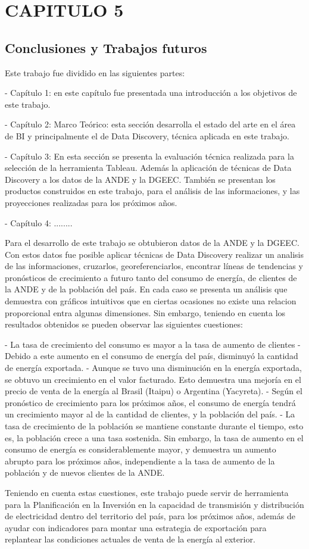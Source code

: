 \pagebreak
\chapter{CAPITULO 5}
\section{Conclusiones y Trabajos futuros}
Este trabajo fue dividido en las siguientes partes:

- Capítulo 1: en este capítulo fue presentada una introducción a los objetivos de este trabajo.

- Capítulo 2: Marco Teórico: esta sección desarrolla el estado del arte en el área de BI y principalmente el de Data Discovery, técnica aplicada en este trabajo.

- Capítulo 3: En esta sección se presenta la evaluación técnica realizada para la selección de la herramienta Tableau. Además la aplicación de técnicas de Data Discovery a los datos de la ANDE y la DGEEC. También se presentan los productos construidos en este trabajo, para el análisis de las informaciones, y las proyecciones realizadas para los próximos años.

- Capítulo 4: ........

Para el desarrollo de este trabajo se obtubieron datos de la ANDE y la DGEEC. Con estos datos fue posible aplicar técnicas de Data Discovery realizar un analisis de las informaciones, cruzarlos, georeferenciarlos, encontrar líneas de tendencias y pronósticos de crecimiento a futuro tanto del consumo de energía, de clientes de la ANDE y de la población del país. En cada caso se presenta un análisis que demuestra con gráficos intuitivos que en ciertas ocasiones no existe una relacion proporcional entra algunas dimensiones. Sin embargo, teniendo en cuenta los resultados obtenidos se pueden observar las siguientes cuestiones:

- La tasa de crecimiento del consumo es mayor a la tasa de aumento de clientes 
- Debido a este aumento en el consumo de energía del país, disminuyó la cantidad de energía exportada.
- Aunque se tuvo una disminución en la energía exportada, se obtuvo un crecimiento en el valor facturado. Esto demuestra una mejoría en el precio de venta de la energía al Brasil (Itaipu) o Argentina (Yacyreta).
- Según el pronóstico de crecimiento para los próximos años, el consumo de energía tendrá un crecimiento mayor al de la cantidad de clientes, y la población del país.
- La tasa de crecimiento de la población se mantiene constante durante el tiempo, esto es, la población crece a una tasa sostenida. Sin embargo, la tasa de aumento en el consumo de energía es considerablemente mayor, y demuestra un aumento abrupto para los próximos años, independiente a la tasa de aumento de la población y de nuevos clientes de la ANDE.


Teniendo en cuenta estas cuestiones, este trabajo puede servir de herramienta para la Planificación en la Inversión en la capacidad de transmisión y distribución de electricidad dentro del territorio del país, para los próximos años, además de ayudar con indicadores para montar una estrategia de exportación para replantear las condiciones actuales de venta de la energía al exterior.